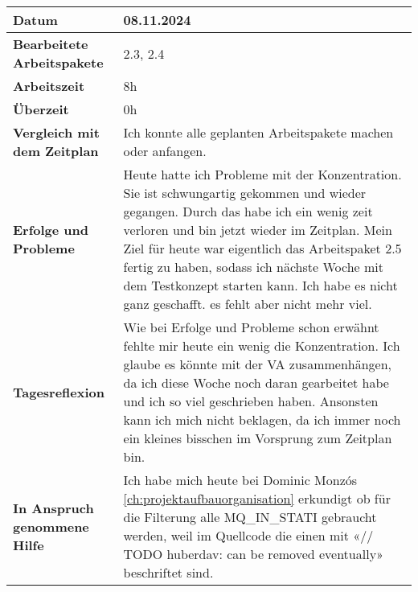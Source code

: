 \begin{longtable}{p{}|p{}}
	\hline
	\textbf{Datum}                       & 08.11.2024            \\
	\hline
	\textbf{Bearbeitete Arbeitspakete}   & 2.3, 2.4                  \\
	\hline
	\textbf{Arbeitszeit}                 & 8h                                    \\
	\hline
	\textbf{Überzeit}                    & 0h                                    \\
	\hline
	\textbf{Vergleich mit dem Zeitplan}  & Ich konnte alle geplanten Arbeitspakete machen oder anfangen.  \\
	\hline
	\textbf{Erfolge und Probleme} & Heute hatte ich Probleme mit der Konzentration. Sie ist schwungartig gekommen und wieder gegangen. Durch das habe ich ein wenig zeit verloren und bin jetzt wieder im Zeitplan. Mein Ziel für heute war eigentlich das Arbeitspaket 2.5 fertig zu haben, sodass ich nächste Woche mit dem Testkonzept starten kann. Ich habe es nicht ganz geschafft. es fehlt aber nicht mehr viel.
	\\
	\hline
	\textbf{Tagesreflexion} & Wie bei Erfolge und Probleme schon erwähnt fehlte mir heute ein wenig die Konzentration. Ich glaube es könnte mit der VA zusammenhängen, da ich diese Woche noch daran gearbeitet habe und ich so viel geschrieben haben. Ansonsten kann ich mich nicht beklagen, da ich immer noch ein kleines bisschen im Vorsprung zum Zeitplan bin.
	\\
	\hline
	\textbf{In Anspruch genommene Hilfe} & Ich habe mich heute bei Dominic Monzós \ref{ch:projektaufbauorganisation} erkundigt ob für die Filterung alle MQ\_IN\_STATI gebraucht werden, weil im Quellcode die einen mit «// TODO huberdav: can be removed eventually» beschriftet sind.                               \\
	\hline
\end{longtable}\label{tab:arbeitsprotokoll-08.11.2024}
\newpage

